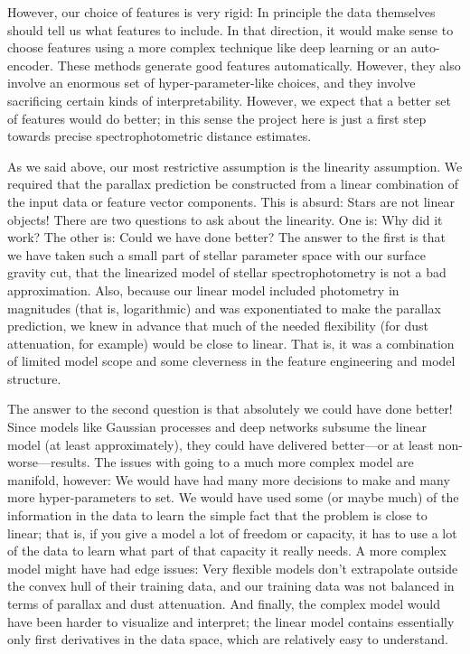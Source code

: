 \documentclass[modern]{aastex62}
\begin{document}
However, our choice of features is very rigid:
In principle the data themselves should tell us what features to include.
In that direction, it would make sense to choose features using a more complex
technique like deep learning or an auto-encoder.
These methods generate good features automatically.
However, they also involve an enormous set of hyper-parameter-like choices,
and they involve sacrificing certain kinds of interpretability.
However, we expect that a better set of features would do better; in this sense
the project here is just a first step towards precise spectrophotometric distance
estimates.

As we said above, our most restrictive assumption is the linearity assumption.
We required that the parallax prediction be constructed from a linear combination
of the input data or feature vector components.
This is absurd: Stars are not linear objects!
There are two questions to ask about the linearity.
One is: Why did it work? The other is: Could we have done better?
The answer to the first is that we have taken such a small part of stellar parameter
space with our surface gravity cut, that the linearized model of stellar
spectrophotometry is not a bad approximation.
Also, because our linear model included photometry in magnitudes (that is, logarithmic)
and was exponentiated to make the parallax prediction, we knew in advance that much
of the needed flexibility (for dust attenuation, for example) would be close to
linear.
That is, it was a combination of limited model scope and some cleverness in the
feature engineering and model structure.

The answer to the second question is that absolutely we could have done better!
Since models like Gaussian processes and deep networks subsume the linear model
(at least approximately), they could have delivered better---or at least non-worse---results.
The issues with going to a much more complex model are manifold, however:
We would have had many more decisions to make and many more hyper-parameters
to set.
We would have used some (or maybe much) of the information in the data to learn
the simple fact that the problem is close to linear; that is, if you give a model
a lot of freedom or capacity, it has to use a lot of the data to learn what part
of that capacity it really needs.
A more complex model might have had edge issues: Very flexible models don't extrapolate
outside the convex hull of their training data, and our training data was not
balanced in terms of parallax and dust attenuation.
And finally, the complex model would have been harder to visualize and interpret;
the linear model contains essentially only first derivatives in the data space, which are
relatively easy to understand.
\end{document}
